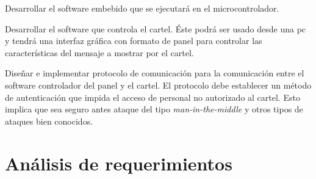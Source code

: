 Desarrollar el software embebido que se ejecutará en el microcontrolador.

Desarrollar el software que controla el cartel. Éste podrá ser usado desde una pc y tendrá una interfaz gráfica con formato de panel para controlar las características del mensaje a mostrar por el cartel.

Diseñar e implementar protocolo de comunicación para la comunicación entre el software controlador del panel y el cartel. El protocolo debe establecer un método de autenticación que impida el acceso de personal no autorizado al cartel. Esto implica que sea seguro antes ataque del tipo \emph{man-in-the-middle} y otros tipos de ataques bien conocidos.

\section{Análisis de requerimientos}

